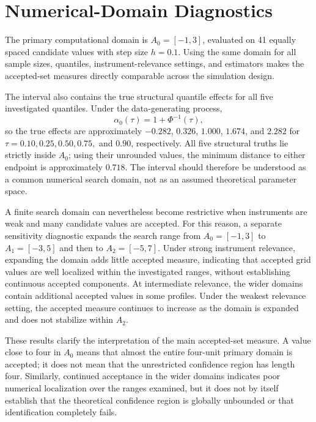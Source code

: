 \section{Numerical-Domain Diagnostics}
\setcounter{equation}{0}\setcounter{table}{0}\setcounter{figure}{0}
\label{app:numerical-domain-diagnostics}

\label{app:domain-choice}

The primary computational domain is \(A_0=[-1,3]\), evaluated on 41 equally spaced candidate values with step size \(h=0.1\). 
Using the same domain for all sample sizes, quantiles, instrument-relevance settings, and estimators makes the accepted-set measures directly comparable across the simulation design.

The interval also contains the true structural quantile effects for all five investigated quantiles. Under the data-generating process,
\[
\alpha_0(\tau)=1+\Phi^{-1}(\tau),
\]
so the true effects are approximately \(-0.282\), \(0.326\), \(1.000\), \(1.674\), and \(2.282\) for \(\tau=0.10,0.25,0.50,0.75,\) and \(0.90\), respectively. All five structural truths lie strictly inside \(A_0\); using their unrounded values, the minimum distance to either endpoint is approximately \(0.718\). The interval should therefore be understood as a common numerical search domain, not as an assumed theoretical parameter space.

A finite search domain can nevertheless become restrictive when instruments are weak and many candidate values are accepted. For this reason, a separate sensitivity diagnostic expands the search range from \(A_0=[-1,3]\) to \(A_1=[-3,5]\) and then to \(A_2=[-5,7]\). Under strong instrument relevance, expanding the domain adds little accepted measure, indicating that accepted grid values are well localized within the investigated ranges, without establishing continuous accepted components. At intermediate relevance, the wider domains contain additional accepted values in some profiles. Under the weakest relevance setting, the accepted measure continues to increase as the domain is expanded and does not stabilize within \(A_2\).

These results clarify the interpretation of the main accepted-set measure. A value close to four in \(A_0\) means that almost the entire four-unit primary domain is accepted; it does not mean that the unrestricted confidence region has length four. Similarly, continued acceptance in the wider domains indicates poor numerical localization over the ranges examined, but it does not by itself establish that the theoretical confidence region is globally unbounded or that identification completely fails.

